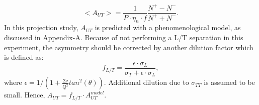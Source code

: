 \begin{equation}
   <A_{UT}> = \frac{1}{P\cdot\eta_{n}\cdot f} \frac{N^{+}-N^{-}}{N^{+}+N^{-}}.
   \label{asym_exp}
\end{equation}
In this projection study, $A_{UT}$ is predicted with a phenomenological model, as discussed in Appendix-A. Because of not
performing a L/T separation in this experiment, the asymmetry should be
corrected by another dilution factor which is defined as:
\begin{equation}
  f_{L/T} =\frac{\epsilon\cdot\sigma_{L} }{\sigma_{T}+\epsilon\cdot\sigma_{L} },
\end{equation} 
where $\epsilon=1/(1+\frac{2\nu}{Q^{2}}tan^{2}(\theta))$. Additional dilution due to $\sigma_{TT}$ is assumed to be small. 
Hence, $A_{UT} = f_{L/T}\cdot A_{UT}^{model}$.

